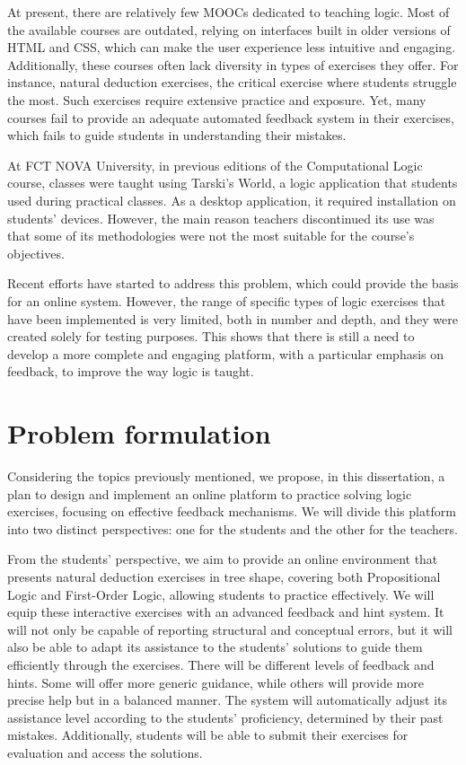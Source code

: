 At present, there are relatively few MOOCs dedicated to teaching logic. Most of the available courses are outdated, relying on interfaces built in older versions of HTML and CSS, which can make the user experience less intuitive and engaging. Additionally, these courses often lack diversity in types of exercises they offer. For instance, natural deduction exercises, the critical exercise where students struggle the most. Such exercises require extensive practice and exposure. Yet, many courses fail to provide an adequate automated feedback system in their exercises, which fails to guide students in understanding their mistakes.

At FCT NOVA University, in previous editions of the Computational Logic course, classes were taught using Tarski's World, a logic application that students used during practical classes. As a desktop application, it required installation on students' devices. However, the main reason teachers discontinued its use was that some of its methodologies were not the most suitable for the course's objectives. 

Recent efforts have started to address this problem, which could provide the basis for an online system. However, the range of specific types of logic exercises that have been implemented is very limited, both in number and depth, and they were created solely for testing purposes. This shows that there is still a need to develop a more complete and engaging platform, with a particular emphasis on feedback, to improve the way logic is taught.

\section{Problem formulation}
\label{tab:problem_formulation}
Considering the topics previously mentioned, we propose, in this dissertation, a plan to design and implement an online platform to practice solving logic exercises, focusing on effective feedback mechanisms. We will divide this platform into two distinct perspectives: one for the students and the other for the teachers.

From the students' perspective, we aim to provide an online environment that presents natural deduction exercises in tree shape, covering both Propositional Logic and First-Order Logic, allowing students to practice effectively. We will equip these interactive exercises with an advanced feedback and hint system. It will not only be capable of reporting structural and conceptual errors, but it will also be able to adapt its assistance to the students' solutions to guide them efficiently through the exercises. There will be different levels of feedback and hints. Some will offer more generic guidance, while others will provide more precise help but in a balanced manner. The system will automatically adjust its assistance level according to the students' proficiency, determined by their past mistakes. Additionally, students will be able to submit their exercises for evaluation and access the solutions.

